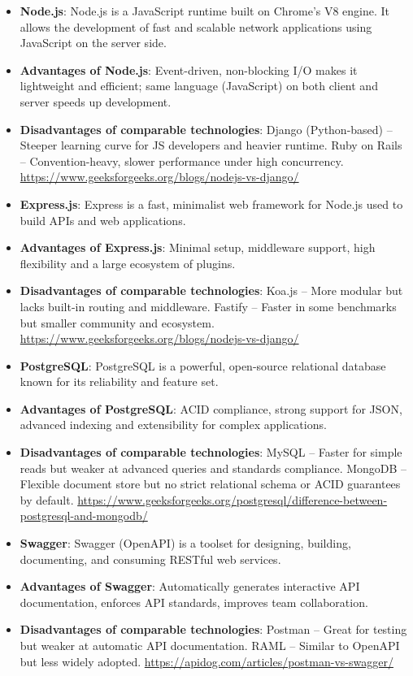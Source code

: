\begin{itemize}
    \item \textbf{Node.js}: Node.js is a JavaScript runtime built on Chrome's V8 engine. It allows the development of fast and scalable network applications using JavaScript on the server side.
    \item \textbf{Advantages of Node.js}: Event-driven, non-blocking I/O makes it lightweight and efficient; same language (JavaScript) on both client and server speeds up development.
    \item \textbf{Disadvantages of comparable technologies}: 
    Django (Python-based) – Steeper learning curve for JS developers and heavier runtime. 
    Ruby on Rails – Convention-heavy, slower performance under high concurrency.
    \url{https://www.geeksforgeeks.org/blogs/nodejs-vs-django/}

    \item \textbf{Express.js}: Express is a fast, minimalist web framework for Node.js used to build APIs and web applications.
    \item \textbf{Advantages of Express.js}: Minimal setup, middleware support, high flexibility and a large ecosystem of plugins.
    \item \textbf{Disadvantages of comparable technologies}: 
    Koa.js – More modular but lacks built-in routing and middleware. 
    Fastify – Faster in some benchmarks but smaller community and ecosystem.
    \url{https://www.geeksforgeeks.org/blogs/nodejs-vs-django/}

    \item \textbf{PostgreSQL}: PostgreSQL is a powerful, open-source relational database known for its reliability and feature set.
    \item \textbf{Advantages of PostgreSQL}: ACID compliance, strong support for JSON, advanced indexing and extensibility for complex applications.
    \item \textbf{Disadvantages of comparable technologies}: 
    MySQL – Faster for simple reads but weaker at advanced queries and standards compliance. 
    MongoDB – Flexible document store but no strict relational schema or ACID guarantees by default.
    \url{https://www.geeksforgeeks.org/postgresql/difference-between-postgresql-and-mongodb/}

    \item \textbf{Swagger}: Swagger (OpenAPI) is a toolset for designing, building, documenting, and consuming RESTful web services.
    \item \textbf{Advantages of Swagger}: Automatically generates interactive API documentation, enforces API standards, improves team collaboration.
    \item \textbf{Disadvantages of comparable technologies}: 
    Postman – Great for testing but weaker at automatic API documentation. 
    RAML – Similar to OpenAPI but less widely adopted.
    \url{https://apidog.com/articles/postman-vs-swagger/}


\end{itemize}
